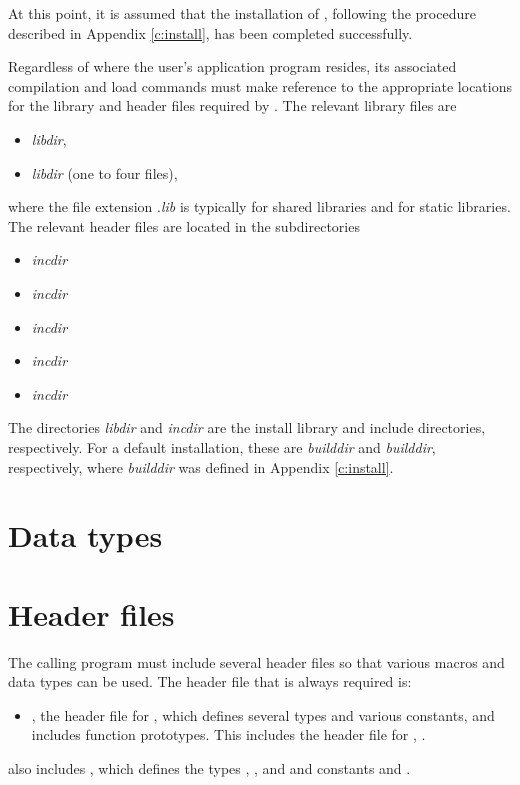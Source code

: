 At this point, it is assumed that the installation of {\kinsol},
following the procedure described in Appendix \ref{c:install}, has
been completed successfully.

Regardless of where the user's application program resides, its
associated compilation and load commands must make reference to the
appropriate locations for the library and header files required by
{\kinsol}.  The relevant library files are
\begin{itemize}
\item {\em libdir},
\item {\em libdir} (one to four files),
\end{itemize}
where the file extension .{\em lib} is typically  for shared libraries
and  for static libraries. The relevant header files are located in
the subdirectories
\begin{itemize}
\item {\em incdir}
\item {\em incdir}
\item {\em incdir}
\item {\em incdir}
\item {\em incdir}
\end{itemize}
The directories {\em libdir} and {\em incdir} are the install library
and include directories, respectively.  For a default installation,
these are {\em builddir} and {\em builddir},
respectively, where {\em builddir} was defined in Appendix \ref{c:install}.

\section{Data types}\label{s:types}


\section{Header files}\label{s:header_sol}
The calling program must include several header files so that various macros
and data types can be used. The header file that is always required is:
%
\begin{itemize}
\item  {},
  the header file for {\kinsol}, which defines several
  types and various constants, and includes function prototypes.  This
  includes the header file for {\kinls}, .
\end{itemize}
%
 also includes ,
which defines the types , , and 
and constants  and .

